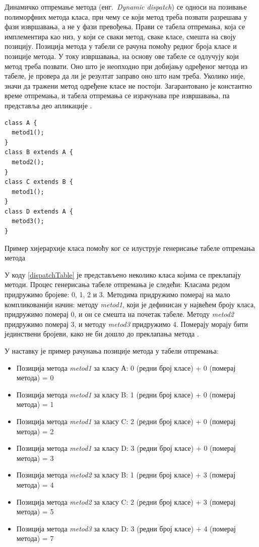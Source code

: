 \documentclass[12pt,oneside]{memoir}
\begin{document}
Динамичко отпремање метода (енг.~\textit{Dynamic dispatch}) се односи на позивање полиморфних метода класа, при чему се који метод треба позвати разрешава у фази извршавања, а не у фази превођења. Прави се табела отпремања, која се имплементира као низ, у који се сваки метод, сваке класе, смешта на своју позицију. Позиција метода у табели се рачуна помоћу редног броја класе и позиције метода. У току извршавања, на основу ове табеле се одлучују који метод треба позвати. Оно што је неопходно при добијању одређеног метода из табеле, је провера да ли је резултат заправо оно што нам треба. Уколико није, значи да тражени метод одређене класе не постоји. Загарантовано је константно време отпремања, и табела отпремања се израчунава пре извршавања, па представља део апликације \cite{Dartino}.

\begin{listing}
\begin{verbatim}
class A {
  metod1();
}
class B extends A {
  metod2();
}
class C extends B {
  metod1();
}
class D extends A {
  metod3();
}
\end{verbatim}
\caption{Пример хијерархије класа помоћу ког се илуструје генерисање табеле отпремања метода}
\label{dispatchTable}
\end{listing}

У коду \ref{dispatchTable} је представљено неколико класа којима се преклапају методи. Процес генерисања табеле отпремања је следећи: Класама редом придружимо бројеве: 0, 1, 2 и 3. Методима придружимо померај на мало компликованији начин: методу \textit{metod1}, који је дефинисан у највећем броју класа, придружимо померај 0, и он се смешта на почетак табеле. Методу \textit{metod2} придружимо померај 3, и методу \textit{metod3} придружимо 4. Померају морају бити јединствени бројеви, како не би дошло до преклапања метода \cite{Dartino}.

У наставку је пример рачунања позиције метода у табели отпремања:
\begin{itemize}
\item Позиција метода \textit{metod1} за класу А: 0 (редни број класе) + 0 (померај метода) = 0
\item Позиција метода \textit{metod1} за класу B: 1 (редни број класе) + 0 (померај метода) = 1
\item Позиција метода \textit{metod1} за класу C: 2 (редни број класе) + 0 (померај метода) = 2
\item Позиција метода \textit{metod1} за класу D: 3 (редни број класе) + 0 (померај метода) = 3
\item Позиција метода \textit{metod2} за класу B: 1 (редни број класе) + 3 (померај метода) = 4
\item Позиција метода \textit{metod2} за класу C: 2 (редни број класе) + 3 (померај метода) = 5
\item Позиција метода \textit{metod3} за класу D: 3 (редни број класе) + 4 (померај метода) = 7
\end{itemize}
\end{document}
